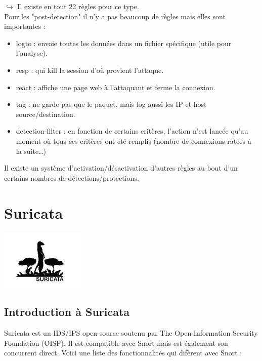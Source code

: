 \documentclass[a4paper,11pt,french]{article}
\begin{document}
$\hookrightarrow$ Il existe en tout 22 règles pour ce type.\\


Pour les "post-detection" il n’y a pas beaucoup de règles mais elles sont importantes : 
\begin{itemize}
\item logto : envoie toutes les données dans un fichier spécifique (utile pour l’analyse).
\item resp : qui kill la session d’où provient l’attaque.
\item react : affiche une page web à l’attaquant et ferme la connexion.
\item tag : ne garde pas que le paquet, mais log aussi les IP et host source/destination.
\item detection-filter : en fonction de certains critères, l’action n’est lancée qu’au moment où tous ces critères ont été remplis (nombre de connexions ratées à la suite…)
\end{itemize}

Il existe un système d’activation/désactivation d’autres règles au bout d’un certains nombres de détections/protections.

\newpage
\section{Suricata}
\begin{center}\includegraphics[width=4cm]{icons/suricata.jpg}\end{center}

\subsection{Introduction à Suricata}

Suricata est un IDS/IPS open source soutenu par The Open Information Security Foundation (OISF). Il est compatible avec Snort mais est également son concurrent direct. Voici une liste des fonctionnalités qui difèrent avec Snort :
\end{document}
